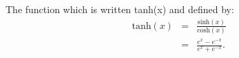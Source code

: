 The function which is written tanh(x) and defined by:
\begin{eqnarray*}
\mathrm{tanh}(x) &=& \frac{\mathrm{sinh}(x)}{\mathrm{cosh}(x)} \\
&=& \frac{e^x - e^{-x}}{e^x + e^{-x}}.
\end{eqnarray*}
  
  